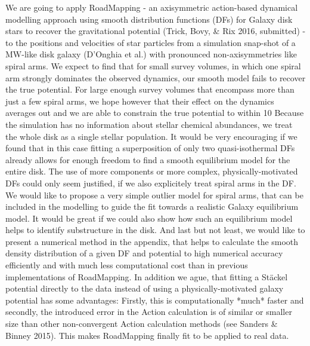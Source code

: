 We are going to apply RoadMapping - an axisymmetric action-based dynamical modelling approach using smooth distribution functions (DFs) for Galaxy disk stars to recover the gravitational potential (Trick, Bovy, \& Rix 2016, submitted) - to the positions and velocities of star particles from a simulation snap-shot of a MW-like disk galaxy (D'Onghia et al.) with pronounced non-axisymmetries like spiral arms. We expect to find that for small survey volumes, in which one spiral arm strongly dominates the observed dynamics, our smooth model fails to recover the true potential. For large enough survey volumes that encompass more than just a few spiral arms, we hope however that their effect on the dynamics averages out and we are able to constrain the true potential to within 10%
Because the simulation has no information about stellar chemical abundances, we treat the whole disk as a single stellar population. It would be very encouraging if we found that in this case fitting a superposition of only two quasi-isothermal DFs already allows for enough freedom to find a smooth equilibrium model for the entire disk. The use of more components or more complex, physically-motivated DFs could only seem justified, if we also explicitely treat spiral arms in the DF. We would like to propose a very simple outlier model for spiral arms, that can be included in the modelling to guide the fit towards a realistic Galaxy equilibrium model. It would be great if we could also show how such an equilibrium model helps to identify substructure in the disk.
And last but not least, we would like to present a numerical method in the appendix, that helps to calculate the smooth density distribution of a given DF and potential to high numerical accuracy efficiently and with much less computational cost than in previous implementations of RoadMapping. In addition we ague, that fitting a Stäckel potential directly to the data instead of using a physically-motivated galaxy potential has some advantages: Firstly, this is computationally *much* faster and secondly, the introduced error in the Action calculation is of similar or smaller size than other non-convergent Action calculation methods (see Sanders \& Binney 2015). This makes RoadMapping finally fit to be applied to real data.